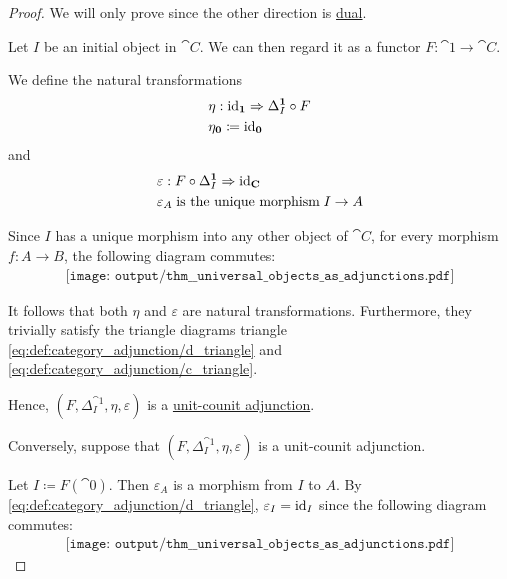 \begin{proof}
  We will only prove  since the other direction is \hyperref[thm:universal_objects_as_adjunctions/initial]{dual}.

  \SufficiencySubProof Let \( I \) be an initial object in \( \cat{C} \). We can then regard it as a functor \( F: \cat{1} \to \cat{C} \).

  We define the natural transformations
  \begin{equation*}
    \begin{aligned}
      &\eta: \id_{\cat{1}} \Rightarrow \Delta_I^{\cat{1}} \bincirc F \\
      &\eta_{\cat{0}} \coloneqq \id_{\cat{0}}
    \end{aligned}
  \end{equation*}
  and
  \begin{equation*}
    \begin{aligned}
      &\varepsilon: F \bincirc \Delta_I^{\cat{1}} \Rightarrow \id_{\cat{C}} \\
      &\varepsilon_A \T{is the unique morphism} I \to A
    \end{aligned}
  \end{equation*}

  Since \( I \) has a unique morphism into any other object of \( \cat{C} \), for every morphism \( f: A \to B \), the following diagram commutes:
  \begin{equation}\label{eq:thm:universal_objects_as_adjunctions/sufficiency_nat}
    \begin{aligned}
      \texttt{[image: output/thm\_\_universal\_objects\_as\_adjunctions.pdf]}
    \end{aligned}
  \end{equation}

  It follows that both \( \eta \) and \( \varepsilon \) are natural transformations. Furthermore, they trivially satisfy the triangle diagrams triangle \eqref{eq:def:category_adjunction/d_triangle} and \eqref{eq:def:category_adjunction/c_triangle}.

  Hence, \( (F, \Delta_I^{\cat{1}}, \eta, \varepsilon) \) is a \hyperref[def:category_adjunction/unit_counit]{unit-counit adjunction}.

  \NecessitySubProof Conversely, suppose that \( (F, \Delta_I^{\cat{1}}, \eta, \varepsilon) \) is a unit-counit adjunction.

  Let \( I \coloneqq F(\cat{0}) \). Then \( \varepsilon_A \) is a morphism from \( I \) to \( A \). By \eqref{eq:def:category_adjunction/d_triangle}, \( \varepsilon_I = \operatorname{id}_I \) since the following diagram commutes:
  \begin{equation}\label{eq:thm:universal_objects_as_adjunctions/d_triangle}
    \begin{aligned}
      \texttt{[image: output/thm\_\_universal\_objects\_as\_adjunctions.pdf]}
    \end{aligned}
  \end{equation}


\end{proof}
